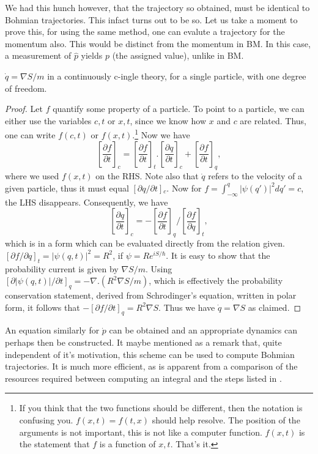 We had this hunch however, that the trajectory so obtained, must be
identical to Bohmian trajectories. This infact turns out to be so.
Let us take a moment to prove this, for using the same method, one
can evalute a trajectory for the momentum also. This would be distinct
from the momentum in BM. In this case, a measurement of $\hat{p}$
yields $p$ (the assigned value), unlike in BM.
\begin{prop*}
$\dot{q}=\nabla S/m$ in a continuously c-ingle theory, for a single
particle, with one degree of freedom.\end{prop*}
\begin{proof}
Let $f$ quantify some property of a particle. To point to a particle,
we can either use the variables $c,t$ or $x,t$, since we know how
$x$ and $c$ are related. Thus, one can write $f(c,t)$ or $f(x,t)$.\footnote{If you think that the two functions should be different, then the
notation is confusing you. $f(x,t)=f(t,x)$ should help resolve. The
position of the arguments is not important, this is not like a computer
function. $f(x,t)$ is the statement that $f$ is a function of $x,t$.
That's it.} Now we have 
\[
\left[\frac{\partial f}{\partial t}\right]_{c}=\left[\frac{\partial f}{\partial t}\right]_{t}.\left[\frac{\partial q}{\partial t}\right]_{c}+\left[\frac{\partial f}{\partial t}\right]_{q},
\]
where we used $f(x,t)$ on the RHS. Note also that $\dot{q}$ refers
to the velocity of a given particle, thus it must equal $\left[\partial q/\partial t\right]{}_{c}$.
Now for $f=\int_{-\infty}^{q}\left|\psi(q')\right|^{2}dq'=c$, the
LHS disappears. Consequently, we have 
\[
\left[\frac{\partial q}{\partial t}\right]_{c}=-\left[\frac{\partial f}{\partial t}\right]_{q}/\left[\frac{\partial f}{\partial q}\right]_{t},
\]
which is in a form which can be evaluated directly from the relation
given. $\left[\partial f/\partial q\right]_{t}=\left|\psi(q,t)\right|^{2}=R^{2}$,
if $\psi=Re^{iS/\hbar}$. It is easy to show that the probability
current is given by $\nabla S/m$. Using $\left[\partial\left|\psi(q,t)\right|/\partial t\right]_{q}=-\nabla.(R^{2}\nabla S/m)$,
which is effectively the probability conservation statement, derived
from Schrodinger's equation, written in polar form, it follows that
$-\left[\partial f/\partial t\right]_{q}=R^{2}\nabla S$. Thus we
have $\dot{q}=\nabla S$ as claimed.
\end{proof}
An equation similarly for $\dot{p}$ can be obtained and an appropriate
dynamics can perhaps then be constructed. It maybe mentioned as a
remark that, quite independent of it's motivation, this scheme can
be used to compute Bohmian trajectories. It is much more efficient,
as is apparent from a comparison of the resources required between
computing an integral and the steps listed in .


